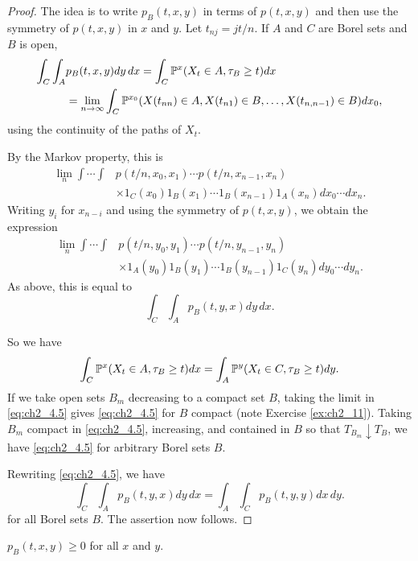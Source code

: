 \begin{proof}
The idea is to write $p_B(t,x,y)$ in terms of $p(t,x,y)$ and then use the symmetry of $p(t,x,y)$ in $x$ and $y$. Let $t_{nj} = jt/n$. If $A$ and $C$ are Borel sets and $B$ is open,
\begin{align*}
    \int_C \int_A &p_B(t,x,y)dy\,dx = \int_C \P^x(X_t \in A, \tau_B \geq t)dx \\
    &= \lim_{n \to \infty} \int_C \P^{x_0}(X(t_{nn}) \in A, X(t_{n1}) \in B,\ldots,X(t_{n,n-1}) \in B)dx_0,
\end{align*}
using the continuity of the paths of $X_t$.

By the Markov property, this is
\begin{align*}
    \lim_{n} \int \cdots \int &p(t/n,x_0,x_1)\cdots p(t/n,x_{n-1},x_n) \\
    &\times 1_C(x_0)1_B(x_1)\cdots 1_B(x_{n-1})1_A(x_n)dx_0\cdots dx_n.
\end{align*}
Writing $y_i$ for $x_{n-i}$ and using the symmetry of $p(t,x,y)$, we obtain the expression
\begin{align*}
    \lim_{n} \int \cdots \int &p(t/n,y_0,y_1)\cdots p(t/n,y_{n-1},y_n) \\
    &\times 1_A(y_0)1_B(y_1)\cdots 1_B(y_{n-1})1_C(y_n)dy_0\cdots dy_n.
\end{align*}
As above, this is equal to
\mpagebreak
\begin{equation}\label{eq:ch2_4.4}
    \int_C \int_A p_B(t,y,x)dy\,dx.
\end{equation}

So we have
\begin{equation}\label{eq:ch2_4.5}
    \int_C \P^x(X_t\in A, \tau_B\ge t)dx=\int_A \P^y(X_t\in C, \tau_B\ge t)dy.
\end{equation}
If we take open sets $B_m$ decreasing to a compact set $B$, taking the limit in \eqref{eq:ch2_4.5} gives \eqref{eq:ch2_4.5} for $B$ compact (note Exercise \ref{ex:ch2_11}). Taking $B_m$ compact in \eqref{eq:ch2_4.5}, increasing, and contained in $B$ so that $T_{B_m} \downarrow T_B$, we have \eqref{eq:ch2_4.5} for arbitrary Borel sets $B$.

Rewriting \eqref{eq:ch2_4.5}, we have
\[
    \int_C \int_A p_B(t,y,x)dy\,dx=\int_A \int_C p_B(t,y,y)dx\,dy.
\]
for all Borel sets $B$. The assertion now follows.
\end{proof}

\begin{lemma}\label{lem:ch2_4.2}
$p_B(t,x,y) \geq 0$ for all $x$ and $y$.
\end{lemma}


